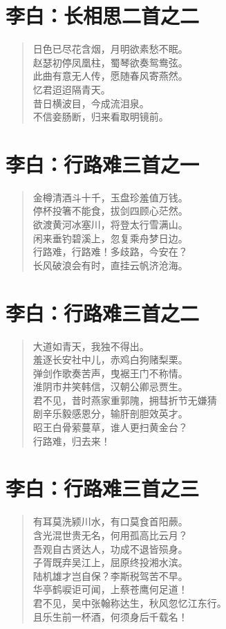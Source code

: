 \documentclass[12pt,oneside]{book}
\newenvironment{shici}{%
\begin{verse}\centering\yanti\large\hspace{12pt}}{\end{verse}}
\begin{document}
\begin{common-format}
\chapter{李白：长相思二首之二}
\begin{shici}
日色已尽花含烟，月明欲素愁不眠。\\
赵瑟初停凤凰柱，蜀琴欲奏鸳鸯弦。\\
此曲有意无人传，愿随春风寄燕然。\\
忆君迢迢隔青天。\\
昔日横波目，今成流泪泉。\\
不信妾肠断，归来看取明镜前。
\end{shici}

\chapter{李白：行路难三首之一}
\begin{shici}
金樽清酒斗十千，玉盘珍羞值万钱。\\
停杯投箸不能食，拔剑四顾心茫然。\\
欲渡黄河冰塞川，将登太行雪满山。\\
闲来垂钓碧溪上，忽复乘舟梦日边。\\
行路难，行路难！多歧路，今安在？\\
长风破浪会有时，直挂云帆济沧海。
\end{shici}


\chapter{李白：行路难三首之二}
\begin{shici}
大道如青天，我独不得出。\\
羞逐长安社中儿，赤鸡白狗赌梨栗。\\
弹剑作歌奏苦声，曳裾王门不称情。\\
淮阴市井笑韩信，汉朝公卿忌贾生。\\
君不见，昔时燕家重郭隗，拥彗折节无嫌猜\\
剧辛乐毅感恩分，输肝剖胆效英才。\\
昭王白骨萦蔓草，谁人更扫黄金台？\\
行路难，归去来！
\end{shici}


\chapter{李白：行路难三首之三}
\begin{shici}
有耳莫洗颍川水，有口莫食首阳蕨。\\
含光混世贵无名，何用孤高比云月？\\
吾观自古贤达人，功成不退皆殒身。\\
子胥既弃吴江上，屈原终投湘水滨。\\
陆机雄才岂自保？李斯税驾苦不早。\\
华亭鹤唳讵可闻，上蔡苍鹰何足道！\\
君不见，吴中张翰称达生，秋风忽忆江东行。\\
且乐生前一杯酒，何须身后千载名！
\end{shici}



\end{common-format}
\end{document}
